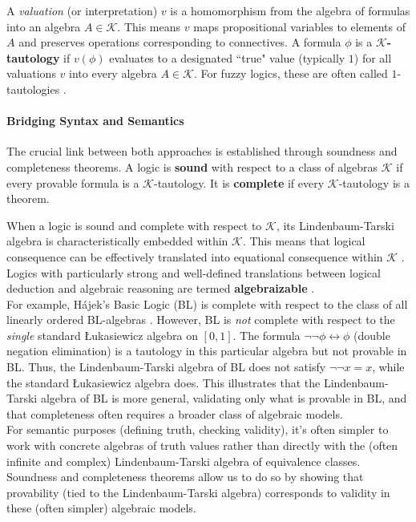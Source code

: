 A \textit{valuation} (or interpretation) $v$ is a homomorphism from the algebra of formulas into an algebra $A \in \mathcal{K}$. This means $v$ maps propositional variables to elements of $A$ and preserves operations corresponding to connectives. A formula $\phi$ is a $\mathcal{K}$\textbf{-tautology} if $v(\phi)$ evaluates to a designated ``true" value (typically $1$) for all valuations $v$ into every algebra $A \in \mathcal{K}$. For fuzzy logics, these are often called $1$-tautologies \cite[Ch.~2]{Hajek1998}.

\paragraph{Bridging Syntax and Semantics} The crucial link between both approaches is established through soundness and completeness theorems. A logic is \textbf{sound} with respect to a class of algebras $\mathcal{K}$ if every provable formula is a $\mathcal{K}$-tautology. It is \textbf{complete} if every $\mathcal{K}$-tautology is a theorem.

When a logic is sound and complete with respect to $\mathcal{K}$, its Lindenbaum-Tarski algebra is characteristically embedded within $\mathcal{K}$. This means that logical consequence can be effectively translated into equational consequence within $\mathcal{K}$ \cite[Abstract]{BlokPigozzi1989}. Logics with particularly strong and well-defined translations between logical deduction and algebraic reasoning are termed \textbf{algebraizable} \cite[Def.~2.10]{BlokPigozzi1989}.\\

For example, Hájek's Basic Logic (BL) \cite[Ch.~2]{Hajek1998} is complete with respect to the class of all linearly ordered BL-algebras \cite[Thm.~2.3.15]{Hajek1998}. However, BL is \textit{not} complete with respect to the \textit{single} standard Łukasiewicz algebra on $[0,1]$. The formula $\neg \neg \phi \leftrightarrow \phi$ (double negation elimination) is a tautology in this particular algebra but not provable in BL. Thus, the Lindenbaum-Tarski algebra of BL does not satisfy $\neg \neg x = x$, while the standard Łukasiewicz algebra does. This illustrates that the Lindenbaum-Tarski algebra of BL is more general, validating only what is provable in BL, and that completeness often requires a broader class of algebraic models.\\

For semantic purposes (defining truth, checking validity), it's often simpler to work with concrete algebras of truth values rather than directly with the (often infinite and complex) Lindenbaum-Tarski algebra of equivalence classes. Soundness and completeness theorems allow us to do so by showing that provability (tied to the Lindenbaum-Tarski algebra) corresponds to validity in these (often simpler) algebraic models.\\

